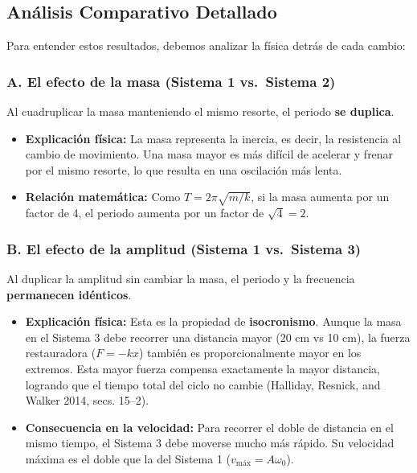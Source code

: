 \documentclass[
  letterpaper,
  DIV=11,
  numbers=noendperiod]{scrreprt}
\providecommand{\tightlist}{%
  \setlength{\itemsep}{0pt}\setlength{\parskip}{0pt}}
\begin{document}
\subsection{Análisis Comparativo
Detallado}\label{anuxe1lisis-comparativo-detallado}

Para entender estos resultados, debemos analizar la física detrás de
cada cambio:

\subsubsection{A. El efecto de la masa (Sistema 1 vs.~Sistema
2)}\label{a.-el-efecto-de-la-masa-sistema-1-vs.-sistema-2}

Al cuadruplicar la masa manteniendo el mismo resorte, el periodo
\textbf{se duplica}.

\begin{itemize}
\tightlist
\item
  \textbf{Explicación física:} La masa representa la inercia, es decir,
  la resistencia al cambio de movimiento. Una masa mayor es más difícil
  de acelerar y frenar por el mismo resorte, lo que resulta en una
  oscilación más lenta.
\item
  \textbf{Relación matemática:} Como \(T = 2\pi\sqrt{m/k}\), si la masa
  aumenta por un factor de 4, el periodo aumenta por un factor de
  \(\sqrt{4} = 2\).
\end{itemize}

\subsubsection{B. El efecto de la amplitud (Sistema 1 vs.~Sistema
3)}\label{b.-el-efecto-de-la-amplitud-sistema-1-vs.-sistema-3}

Al duplicar la amplitud sin cambiar la masa, el periodo y la frecuencia
\textbf{permanecen idénticos}.

\begin{itemize}
\tightlist
\item
  \textbf{Explicación física:} Esta es la propiedad de
  \textbf{isocronismo}. Aunque la masa en el Sistema 3 debe recorrer una
  distancia mayor (20 cm vs 10 cm), la fuerza restauradora (\(F = -kx\))
  también es proporcionalmente mayor en los extremos. Esta mayor fuerza
  compensa exactamente la mayor distancia, logrando que el tiempo total
  del ciclo no cambie (Halliday, Resnick, and Walker 2014, secs. 15--2).
\item
  \textbf{Consecuencia en la velocidad:} Para recorrer el doble de
  distancia en el mismo tiempo, el Sistema 3 debe moverse mucho más
  rápido. Su velocidad máxima es el doble que la del Sistema 1
  (\(v_{\text{máx}} = A\omega_0\)).
\end{itemize}
\end{document}
